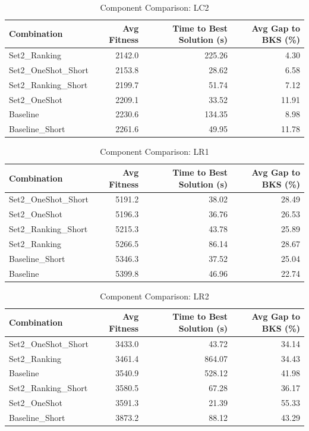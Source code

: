 \documentclass{article}
\begin{document}
\begin{table}[htbp]
\centering
\caption{Component Comparison: LC2}
\label{tab:comparison_lc2}
\begin{tabular}{lrrr}
\toprule
Combination & Avg Fitness & Time to Best Solution (s) & Avg Gap to BKS (\%) \\
\midrule
Set2\_Ranking & 2142.0 & 225.26 & 4.30 \\
Set2\_OneShot\_Short & 2153.8 & 28.62 & 6.58 \\
Set2\_Ranking\_Short & 2199.7 & 51.74 & 7.12 \\
Set2\_OneShot & 2209.1 & 33.52 & 11.91 \\
Baseline & 2230.6 & 134.35 & 8.98 \\
Baseline\_Short & 2261.6 & 49.95 & 11.78 \\
\bottomrule
\end{tabular}
\end{table}

\begin{table}[htbp]
\centering
\caption{Component Comparison: LR1}
\label{tab:comparison_lr1}
\begin{tabular}{lrrr}
\toprule
Combination & Avg Fitness & Time to Best Solution (s) & Avg Gap to BKS (\%) \\
\midrule
Set2\_OneShot\_Short & 5191.2 & 38.02 & 28.49 \\
Set2\_OneShot & 5196.3 & 36.76 & 26.53 \\
Set2\_Ranking\_Short & 5215.3 & 43.78 & 25.89 \\
Set2\_Ranking & 5266.5 & 86.14 & 28.67 \\
Baseline\_Short & 5346.3 & 37.52 & 25.04 \\
Baseline & 5399.8 & 46.96 & 22.74 \\
\bottomrule
\end{tabular}
\end{table}

\begin{table}[htbp]
\centering
\caption{Component Comparison: LR2}
\label{tab:comparison_lr2}
\begin{tabular}{lrrr}
\toprule
Combination & Avg Fitness & Time to Best Solution (s) & Avg Gap to BKS (\%) \\
\midrule
Set2\_OneShot\_Short & 3433.0 & 43.72 & 34.14 \\
Set2\_Ranking & 3461.4 & 864.07 & 34.43 \\
Baseline & 3540.9 & 528.12 & 41.98 \\
Set2\_Ranking\_Short & 3580.5 & 67.28 & 36.17 \\
Set2\_OneShot & 3591.3 & 21.39 & 55.33 \\
Baseline\_Short & 3873.2 & 88.12 & 43.29 \\
\bottomrule
\end{tabular}
\end{table}
\end{document}
